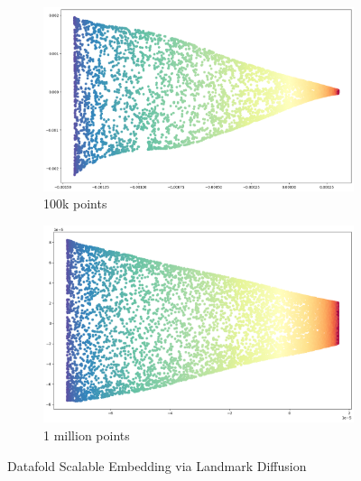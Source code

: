 \begin{itemize}
\begin{itemize}
	      	      \begin{figure}[H]
	      	      	\centering
	      	      	\begin{subfigure}{0.5\textwidth}
	      	      		\includegraphics[width=\linewidth]{images/roseland_SwissRoll100k.png}
	      	      		\caption{100k points}
	      	      		\label{fig:datafold_SwissRollRoseland_100k}
	      	      	\end{subfigure}
	      	      	\begin{subfigure}{0.5\textwidth}
	      	      		\includegraphics[width=\linewidth]{images/roseland_SwissRoll1million.png}
	      	      		\caption{1 million points}
	      	      		\label{fig:datafold_SwissRollRoseland_1M}
	      	      	\end{subfigure}
	      	      	\label{fig:roseland}
	      	      	\caption{Datafold Scalable Embedding via Landmark Diffusion}
	      	      \end{figure}
	      	      

\end{itemize}
\end{itemize}

